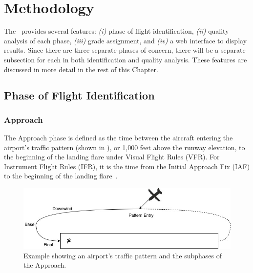 
\chapter{Methodology} \label{ch:methodology}

	The \toolname\ provides several features: \textit{(i)} phase of flight identification, \textit{(ii)} quality analysis of each phase, \textit{(iii)} grade assignment, and \textit{(iv)} a web interface to display results.  Since there are three separate phases of concern, there will be a separate subsection for each in both identification and quality analysis.  These features are discussed in more detail in the rest of this Chapter.

\section{Phase of Flight Identification} \label{sec:phase_identification}


	\subsection{Approach}
    
    	The Approach phase is defined as the time between the aircraft entering the airport's traffic pattern (shown in ), or 1,000 feet above the runway elevation, to the beginning of the landing flare under Visual Flight Rules (VFR).  For Instrument Flight Rules (IFR), it is the time from the Initial Approach Fix (IAF) to the beginning of the landing flare~\cite{cictt2013phase}.
        
        \begin{figure}
        	\centering
            \includegraphics[width=\linewidth]{img/airport_traffic_pattern.jpg}
            \caption{Example showing an airport's traffic pattern and the subphases of the Approach.}
            \label{fig:traffic_pattern}
        \end{figure}
        
